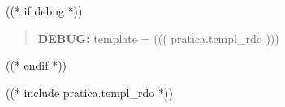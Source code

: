 \documentclass[a4paper,12pt]{letter}
\begin{document}
\topaddr

((* if debug *))
\begin{quotation}
\textbf{DEBUG:} template = ((( pratica.templ_rdo )))
\end{quotation}
((* endif *))

((* include pratica.templ_rdo *))
\end{document}
